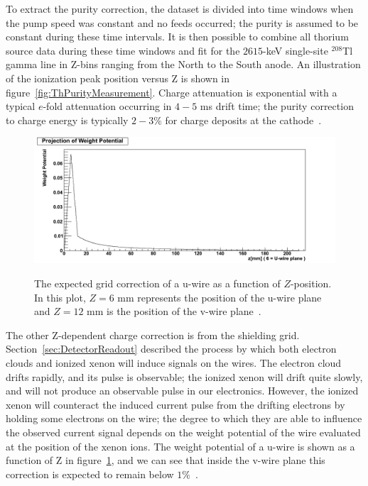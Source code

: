 To extract the purity correction, the dataset is divided into time windows when the pump speed was constant and no feeds occurred; the purity is assumed to be constant during these time intervals.  It is then possible to combine all thorium source data during these time windows and fit for the $2615$-keV single-site $^{208}$Tl gamma line in Z-bins ranging from the North to the South anode.  An illustration of the ionization peak position versus Z is shown in figure~\ref{fig:ThPurityMeasurement}.  Charge attenuation is exponential with a typical $e$-fold attenuation occurring in $4-5$ ms drift time; the purity correction to charge energy is typically $2-3\%$ for charge deposits at the cathode~\cite{EnergyDocumentRun2ab}.

\begin{figure}
\begin{center}
\includegraphics[keepaspectratio=true,width=\textwidth]{GridCorrectionVsZ.png}
\end{center}
\renewcommand{\baselinestretch}{1}
\small\normalsize
\begin{quote}
\caption{The expected grid correction of a u-wire as a function of $Z$-position.  In this plot, $Z = 6$ mm represents the position of the u-wire plane and $Z = 12$ mm is the position of the v-wire plane~\cite{EnergyDocumentRun2a}.}
\label{fig:GridCorrectionVsZ}
\end{quote}
\end{figure}
\renewcommand{\baselinestretch}{2}
\small\normalsize

The other Z-dependent charge correction is from the shielding grid.  Section~\ref{sec:DetectorReadout} described the process by which both electron clouds and ionized xenon will induce signals on the wires.  The electron cloud drifts rapidly, and its pulse is observable; the ionized xenon will drift quite slowly, and will not produce an observable pulse in our electronics.  However, the ionized xenon will counteract the induced current pulse from the drifting electrons by holding some electrons on the wire; the degree to which they are able to influence the observed current signal depends on the weight potential of the wire evaluated at the position of the xenon ions.  The weight potential of a u-wire is shown as a function of Z in figure~\ref{fig:GridCorrectionVsZ}, and we can see that inside the v-wire plane this correction is expected to remain below $1\%$~\cite{EnergyDocumentRun2a}.

